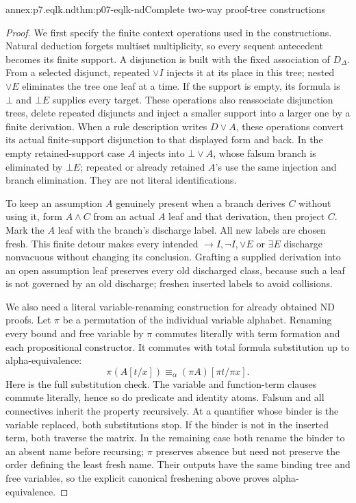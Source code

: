 \begin{annexitem}{annex:p7.eqlk.nd}{thm:p07-eqlk-nd}{Complete two-way proof-tree constructions}
\begin{proof}
We first specify the finite context operations used in the constructions.
Natural deduction forgets multiset multiplicity, so every sequent antecedent
becomes its finite support. A disjunction is built with the fixed association
of \(D_\Delta\). From a selected disjunct, repeated \(\lor I\)
injects it at its place in this tree; nested \(\lor E\) eliminates the
tree one leaf at a time. If the support is empty, its formula is \(\bot\)
and \(\bot E\) supplies every target. These operations also reassociate
disjunction trees, delete repeated disjuncts and inject a smaller support
into a larger one by a finite derivation. When a rule description writes
\(D\lor A\), these operations convert its actual finite-support
disjunction to that displayed form and back. In the empty retained-support
case \(A\) injects into \(\bot\lor A\), whose falsum branch is
eliminated by \(\bot E\); repeated or already retained \(A\)'s use
the same injection and branch elimination. They are not literal identifications.

To keep an assumption \(A\) genuinely present when a branch derives
\(C\) without using it, form \(A\land C\) from an actual \(A\)
leaf and that derivation, then project \(C\). Mark the \(A\) leaf
with the branch's discharge label. All new labels are chosen fresh.
This finite detour makes every intended \(\to I,\neg I,\lor E\)
or \(\exists E\) discharge nonvacuous without changing its conclusion.
Grafting a supplied derivation into an open assumption leaf preserves
every old discharged class, because such a leaf is not governed by an
old discharge; freshen inserted labels to avoid collisions.

We also need a literal variable-renaming construction for already obtained
ND proofs. Let \(\pi\) be a permutation of the individual variable
alphabet. Renaming every bound and free variable by \(\pi\) commutes
literally with term formation and each propositional constructor. It
commutes with total formula substitution up to alpha-equivalence:
\[
 \pi(A[t/x])\equiv_\alpha (\pi A)[\pi t/\pi x].
\]
Here is the full substitution check. The variable and function-term clauses
commute literally, hence so do predicate and identity atoms. Falsum and
all connectives inherit the property recursively. At a quantifier whose
binder is the variable replaced, both substitutions stop. If the binder
is not in the inserted term, both traverse the matrix. In the remaining
case both rename the binder to an absent name before recursing; \(\pi\)
preserves absence but need not preserve the order defining the least fresh
name. Their outputs have the same binding tree and free variables, so
the explicit canonical freshening above proves alpha-equivalence.


\end{proof}
\end{annexitem}
